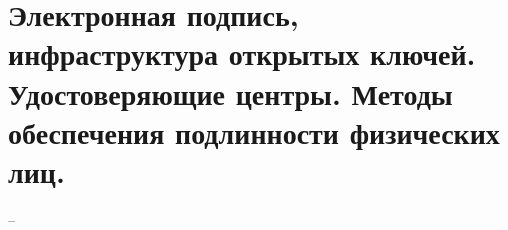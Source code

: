 \section{Электронная подпись, инфраструктура открытых ключей. Удостоверяющие центры. Методы обеспечения подлинности физических лиц.}

--